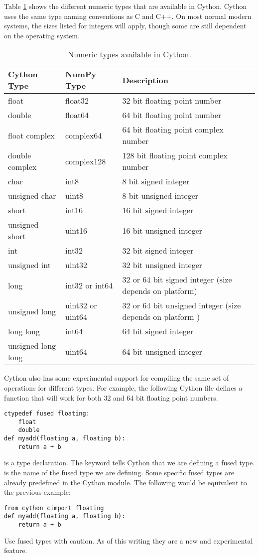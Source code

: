 Table \ref{table:cython_types} shows the different numeric types that are available in Cython.
Cython uses the same type naming conventions as C and C++.
On most normal modern systems, the sizes listed for integers will apply, though some are still dependent on the operating system.

\begin{table}
\begin{center}
\begin{tabular}{|p{2.8cm}|p{2.5cm}|p{6cm}|}
\hline
Cython Type & NumPy Type& Description \\
\hline
float & float32 & 32 bit floating point number \\
double & float64 & 64 bit floating point number \\
float complex & complex64 & 64 bit floating point complex number \\
double complex & complex128 & 128 bit floating point complex number \\
char & int8 & 8 bit signed integer \\
unsigned char & uint8 & 8 bit unsigned integer \\
short & int16 & 16 bit signed integer \\
unsigned short & uint16 & 16 bit unsigned integer \\
int & int32 & 32 bit signed integer \\
unsigned int & uint32 & 32 bit unsigned integer \\
long & int32 or int64 & 32 or 64 bit signed integer (size depends on platform) \\
unsigned long & uint32 or uint64 & 32 or 64 bit unsigned integer (size depends on platform ) \\
long long & int64 & 64 bit signed integer \\
unsigned long long & uint64 & 64 bit unsigned integer \\
\hline
\end{tabular}
\end{center}
\caption{Numeric types available in Cython.}
\label{table:cython_types}
\end{table}

Cython also has some experimental support for compiling the same set of operations for different types.
For example, the following Cython file defines a function  that will work for both 32 and 64 bit floating point numbers.
\begin{lstlisting}
ctypedef fused floating:
    float
    double
def myadd(floating a, floating b):
    return a + b
\end{lstlisting}
 is a type declaration.
The  keyword tells Cython that we are defining a fused type.
 is the name of the fused type we are defining.
Some specific fused types are already predefined in the Cython module.
The following would be equivalent to the previous example:
\begin{lstlisting}
from cython cimport floating
def myadd(floating a, floating b):
    return a + b
\end{lstlisting}
Use fused types with caution.
As of this writing they are a new and experimental feature.

